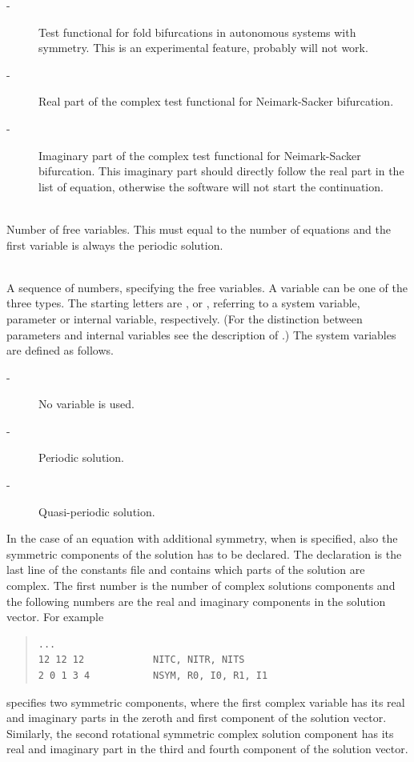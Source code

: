 \documentclass[10pt,a4paper]{ddedoc}
\begin{document}
\begin{description}
\begin{description}
\item[ -] Test functional for fold bifurcations in autonomous systems
with symmetry. This is an experimental feature, probably will not work.
\item[ -] Real part of the complex test functional for Neimark-Sacker
bifurcation.
\item[ -] Imaginary part of the complex test functional for
Neimark-Sacker bifurcation. This imaginary part should directly follow the real
part in the list of equation, otherwise the software will not start the
continuation.
\end{description}
\item[\funp{NVAR}] ~\\
	Number of free variables. This must equal to the number of equations and the
first variable is always the periodic solution.
\item[\funp{VAR}] ~\\
	A sequence of numbers, specifying the free variables. A variable can be one
of the three types. The starting letters are ,  or ,
referring to a system variable, parameter or internal variable, respectively.
(For the distinction between parameters and internal variables see the description of .) The
system variables are defined as follows.
\begin{description}
\item[ -] No variable is used.
\item[ -] Periodic solution.
\item[ -] Quasi-periodic solution.
\end{description}
In the case of an equation with additional symmetry, when  is
specified, also the symmetric components of the solution has to be declared.
The declaration is the last line of the constants file and contains which parts
of the solution are complex. The first number is the number of complex
solutions components and the following numbers are the real and imaginary components in the solution
vector. For example
{ \small \begin{quote} \begin{lstlisting}[basicstyle=\tt,frame=single]
...
12 12 12            NITC, NITR, NITS
2 0 1 3 4           NSYM, R0, I0, R1, I1
\end{lstlisting} \end{quote} } \noindent
specifies two symmetric components, where the first complex variable has its
real and imaginary parts in the zeroth and first component of the solution
vector.
Similarly, the second rotational symmetric complex solution component has its
real and imaginary part in the third and fourth component of the solution
vector.
\end{description}
\end{document}
